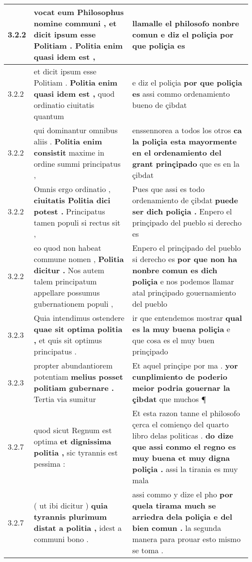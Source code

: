 \begin{tabular}{|p{1cm}|p{6.5cm}|p{6.5cm}|}
3.2.2 & vocat eum Philosophus nomine communi , \textbf{ et dicit ipsum esse Politiam . } Politia enim quasi idem est , & llamalle el philosofo nonbre comun \textbf{ e diz el poliçia } por que poliçia es \\\hline
3.2.2 & et dicit ipsum esse Politiam . \textbf{ Politia enim quasi idem est , } quod ordinatio ciuitatis quantum & e diz el poliçia \textbf{ por que poliçia es } assi commo ordenamiento bueno de çibdat \\\hline
3.2.2 & qui dominantur omnibus aliis . \textbf{ Politia enim consistit } maxime in ordine summi principatus , & enssennorea a todos los otros \textbf{ ca la poliçia esta mayormente en el ordenamiento del grant prinçipado } que es en la çibdat \\\hline
3.2.2 & Omnis ergo ordinatio , \textbf{ ciuitatis Politia dici potest . } Principatus tamen populi si rectus sit , & Pues que assi es todo ordenamiento de çibdat \textbf{ puede ser dicħ poliçia . } Enpero el prinçipado del pueblo si derecho es \\\hline
3.2.2 & eo quod non habeat commune nomen , \textbf{ Politia dicitur . } Nos autem talem principatum appellare possumus gubernationem populi , & Enpero el prinçipado del pueblo si derecho es \textbf{ por que non ha nonbre comun es dich poliçia } e nos podemos llamar atal prinçipado gouernamiento del pueblo \\\hline
3.2.3 & Quia intendimus ostendere \textbf{ quae sit optima politia , } et quis sit optimus principatus . & ir que entendemos mostrar \textbf{ qual es la muy buena poliçia } e que cosa es el muy buen prinçipado \\\hline
3.2.3 & propter abundantiorem potentiam \textbf{ melius posset politiam gubernare . } Tertia via sumitur & Et aquel prinçipe por ma . \textbf{ yor cunplimiento de poderio meior podria gouernar la çibdat } que muchos ¶ \\\hline
3.2.7 & quod sicut Regnum est optima \textbf{ et dignissima politia , } sic tyrannis est pessima : & Et esta razon tanne el philosofo çerca el comienço del quarto libro delas politicas . \textbf{ do dize que assi conmo el regno es muy buena et muy digna poliçia . } assi la tirania es muy mala \\\hline
3.2.7 & ( ut ibi dicitur ) \textbf{ quia tyrannis plurimum distat a politia , } idest a communi bono . & assi commo y dize el pho \textbf{ por quela tirama much se arriedra dela poliçia e del bien comun . } la segunda manera para prouar esto mismo se toma . \\\hline

\end{tabular}
